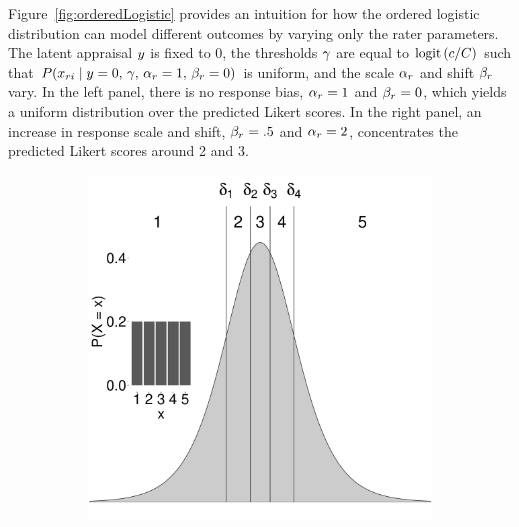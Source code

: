 \documentclass[a4paper,usenames,dvipsnames]{article}
\begin{document}
Figure~\ref{fig:orderedLogistic} provides an intuition for how the ordered logistic distribution can model different outcomes by varying only the rater parameters. The latent appraisal $y$ is fixed to 0, the thresholds $\gamma$ are equal to $\text{logit}\left(c/C\right)$ such that $P(x_{ri}\mid y=0,\,\gamma,\,\alpha_r=1,\,\beta_r=0)$ is uniform, and the scale $\alpha_r$ and shift $\beta_r$ vary. In the left panel, there is no response bias, $\alpha_r = 1$ and $\beta_r = 0$, which yields a uniform distribution over the predicted Likert scores. In the right panel, an increase in response scale and shift, $\beta_r = .5$ and $\alpha_r = 2$, concentrates the predicted Likert scores around 2 and 3.
\begin{figure}[!ht]
	\centering
	\begin{subfigure}{.5\textwidth}
		\centering
		\includegraphics[width=.97\textwidth]{figures/orderedLogisticUnbiased.pdf}
	\end{subfigure}%
	\begin{subfigure}{.5\textwidth}
		\centering

\end{subfigure}
\end{figure}
\end{document}
